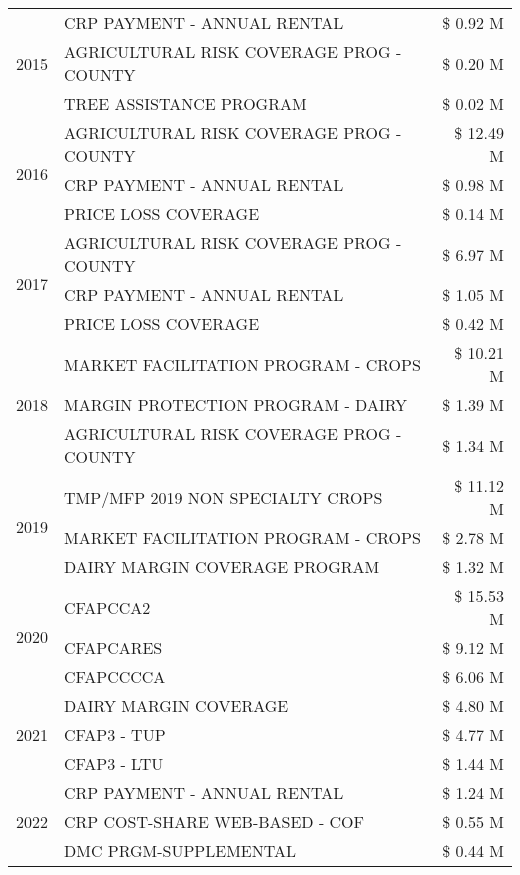 \begin{tabular}{llr}
\cline{1-3}
\multirow[t]{3}{*}{2015} & CRP PAYMENT - ANNUAL RENTAL & \$ 0.92 M \\
 & AGRICULTURAL RISK COVERAGE PROG - COUNTY & \$ 0.20 M \\
 & TREE ASSISTANCE PROGRAM & \$ 0.02 M \\
\cline{1-3}
\multirow[t]{3}{*}{2016} & AGRICULTURAL RISK COVERAGE PROG - COUNTY & \$ 12.49 M \\
 & CRP PAYMENT - ANNUAL RENTAL & \$ 0.98 M \\
 & PRICE LOSS COVERAGE & \$ 0.14 M \\
\cline{1-3}
\multirow[t]{3}{*}{2017} & AGRICULTURAL RISK COVERAGE PROG - COUNTY & \$ 6.97 M \\
 & CRP PAYMENT - ANNUAL RENTAL & \$ 1.05 M \\
 & PRICE LOSS COVERAGE & \$ 0.42 M \\
\cline{1-3}
\multirow[t]{3}{*}{2018} & MARKET FACILITATION PROGRAM - CROPS & \$ 10.21 M \\
 & MARGIN PROTECTION PROGRAM - DAIRY & \$ 1.39 M \\
 & AGRICULTURAL RISK COVERAGE PROG - COUNTY & \$ 1.34 M \\
\cline{1-3}
\multirow[t]{3}{*}{2019} & TMP/MFP 2019 NON SPECIALTY CROPS & \$ 11.12 M \\
 & MARKET FACILITATION PROGRAM - CROPS & \$ 2.78 M \\
 & DAIRY MARGIN COVERAGE PROGRAM & \$ 1.32 M \\
\cline{1-3}
\multirow[t]{3}{*}{2020} & CFAPCCA2 & \$ 15.53 M \\
 & CFAPCARES & \$ 9.12 M \\
 & CFAPCCCCA & \$ 6.06 M \\
\cline{1-3}
\multirow[t]{3}{*}{2021} & DAIRY MARGIN COVERAGE & \$ 4.80 M \\
 & CFAP3 - TUP & \$ 4.77 M \\
 & CFAP3 - LTU & \$ 1.44 M \\
\cline{1-3}
\multirow[t]{3}{*}{2022} & CRP PAYMENT - ANNUAL RENTAL & \$ 1.24 M \\
 & CRP COST-SHARE WEB-BASED - COF & \$ 0.55 M \\
 & DMC PRGM-SUPPLEMENTAL & \$ 0.44 M \\
\cline{1-3}
\bottomrule
\end{tabular}
